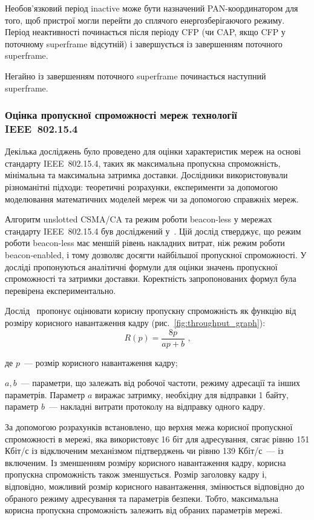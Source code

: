 \documentclass[a4paper,ukrainian,utf8,nocolumnsxix,nocolumnxxxii,nocolumnxxxi,floatsection,equationsection]{eskdtext}
\renewcommand\paragraph{\subsubsection}
\newcommand{\figref}[1]{рис.~\ref{#1}}
\newcommand{\iee}[0]{IEEE~802.15.4\xspace}
\newcommand{\csma}[0]{CSMA/CA\xspace}
\newcommand{\ucsma}[0]{unslotted \csma\xspace}
\newcommand{\blm}[0]{beacon-less\xspace}
\newcommand{\bem}[0]{beacon-enabled\xspace}
\begin{document}
Необов'язковий період inactive може бути назначений PAN-координатором для того, щоб пристрої могли перейти до сплячого енергозберігаючого режиму. Період неактивності починається після періоду CFP (чи CAP, якщо CFP у поточному superframe відсутній) і завершується із завершенням поточного superframe.

Негайно із завершенням поточного superframe починається наступний superframe. 

\paragraph{Оцінка пропускної спроможності мереж технології \iee}
\label{par:throughput:evaluation}

Декілька досліджень було проведено для оцінки характеристик мереж на основі стандарту \iee, таких як максимальна пропускна спроможність, мінімальна та максимальна затримка доставки. Дослідники використовували різноманітні підходи: теоретичні розрахунки, експерименти за допомогою моделювання математичних моделей мереж чи за допомогою справжніх мереж.

Алгоритм \ucsma та режим роботи \blm у мережах стандарту \iee був досліджений у~\cite{thoroughput:analysis:unslotted:ieee}. Цій дослід стверджує, що режим роботи \blm має меншій рівень накладних витрат, ніж режим роботи \bem, і тому дозволяє досягти найбільшої пропускної спроможності. У досліді пропонуються аналітичні формули для оцінки значень пропускної спроможності та затримки доставки. Коректність запропонованих формул була перевірена експериментально.

Дослід~\cite{thoroughput:analysis:unslotted:ieee} пропонує оцінювати корисну пропускну спроможність як функцію від розміру корисного навантаження кадру (\figref{fig:throughput_graph}):
\begin{equation}\label{eq:throughput}
	R(p) = \frac{8p}{ap + b} \text{ ,}
\end{equation}

де $p$~--- розмір корисного навантаження кадру;

$a,b$~--- параметри, що залежать від робочої частоти, режиму адресації та інших параметрів. Параметр $a$ виражає затримку, необхідну для відправки 1 байту, параметр $b$~--- накладні витрати протоколу на відправку одного кадру.

За допомогою розрахунків встановлено, що верхня межа корисної пропускної спроможності в мережі, яка використовує 16 біт для адресування, сягає рівню 151 Кбіт/с із відключеним механізмом підтверджень чи рівню 139 Кбіт/с~--- із включеним. Із зменшенням розміру корисного навантаження кадру, корисна пропускна спроможність також зменшується. Розмір заголовку кадру і, відповідно, можливий розмір корисного навантаження, змінюється відповідно до обраного режиму адресування та параметрів безпеки. Тобто, максимальна корисна пропускна спроможність залежить від обраних параметрів мережі.
\end{document}
